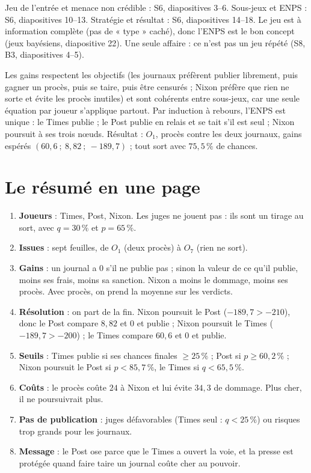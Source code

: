 \documentclass[11pt,a4paper]{article}
\theoremstyle{definition}
\begin{document}
\begin{cours}
Jeu de l'entrée et menace non crédible : S6, diapositives 3--6. Sous-jeux et ENPS : S6, diapositives 10--13. Stratégie et résultat : S6, diapositives 14--18. Le jeu est à information complète (pas de « type » caché), donc l'ENPS est le bon concept (jeux bayésiens, diapositive 22). Une seule affaire : ce n'est pas un jeu répété (S8, B3, diapositives 4--5).
\end{cours}

\begin{reponse}
Les gains respectent les objectifs (les journaux préfèrent publier librement, puis gagner un procès, puis se taire, puis être censurés ; Nixon préfère que rien ne sorte et évite les procès inutiles) et sont cohérents entre sous-jeux, car une seule équation par joueur s'applique partout. Par induction à rebours, l'ENPS est unique : le Times publie ; le Post publie en relais et se tait s'il est seul ; Nixon poursuit à ses trois nœuds. Résultat : $O_1$, procès contre les deux journaux, gains espérés $(60,6\ ;\ 8,82\ ;\ -189,7)$ ; tout sort avec $75,5\,\%$ de chances.
\end{reponse}

\section{Le résumé en une page}

\begin{enumerate}[leftmargin=*,itemsep=3pt]
\item \textbf{Joueurs} : Times, Post, Nixon. Les juges ne jouent pas : ils sont un tirage au sort, avec $q=30\,\%$ et $p=65\,\%$.
\item \textbf{Issues} : sept feuilles, de $O_1$ (deux procès) à $O_7$ (rien ne sort).
\item \textbf{Gains} : un journal a $0$ s'il ne publie pas ; sinon la valeur de ce qu'il publie, moins ses frais, moins sa sanction. Nixon a moins le dommage, moins ses procès. Avec procès, on prend la moyenne sur les verdicts.
\item \textbf{Résolution} : on part de la fin. Nixon poursuit le Post ($-189,7>-210$), donc le Post compare $8,82$ et $0$ et publie ; Nixon poursuit le Times ($-189,7>-200$) ; le Times compare $60,6$ et $0$ et publie.
\item \textbf{Seuils} : Times publie si ses chances finales $\ge25\,\%$ ; Post si $p\ge60,2\,\%$ ; Nixon poursuit le Post si $p<85,7\,\%$, le Times si $q<65,5\,\%$.
\item \textbf{Coûts} : le procès coûte $24$ à Nixon et lui évite $34,3$ de dommage. Plus cher, il ne poursuivrait plus.
\item \textbf{Pas de publication} : juges défavorables (Times seul : $q<25\,\%$) ou risques trop grands pour les journaux.
\item \textbf{Message} : le Post ose parce que le Times a ouvert la voie, et la presse est protégée quand faire taire un journal coûte cher au pouvoir.
\end{enumerate}
\end{document}
